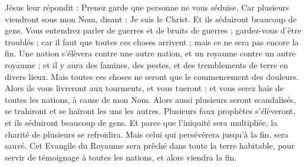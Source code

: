 \begin{multicols}{2}
Jésus leur répondit : Prenez garde que personne ne vous séduise.
Car plusieurs viendront sous mon Nom, disant : Je suis le Christ. Et ils séduiront beaucoup de gens.
Vous entendrez parler de guerres et de bruits de guerres ; gardez-vous d’être troublés ; car il faut que toutes ces choses arrivent ; mais ce ne sera pas encore la fin.
Une nation s'élèvera contre une autre nation, et un royaume contre un autre royaume ; et il y aura des famines, des pestes, et des tremblements de terre en divers lieux.
Mais toutes ces choses ne seront que le commencement des douleurs.
Alors ils vous livreront aux tourments, et vous tueront ; et vous serez haïs de toutes les nations, à cause de mon Nom.
Alors aussi plusieurs seront scandalisés, se trahiront et se haïront les uns les autres.
Plusieurs faux prophètes s'élèveront, et ils séduiront beaucoup de gens.
Et parce que l'iniquité sera multipliée, la charité de plusieurs se refroidira.
Mais celui qui persévérera jusqu'à la fin, sera sauvé.
Cet Evangile du Royaume sera prêché dans toute la terre habitable, pour servir de témoignage à toutes les nations, et alors viendra la fin.

\end{multicols}
